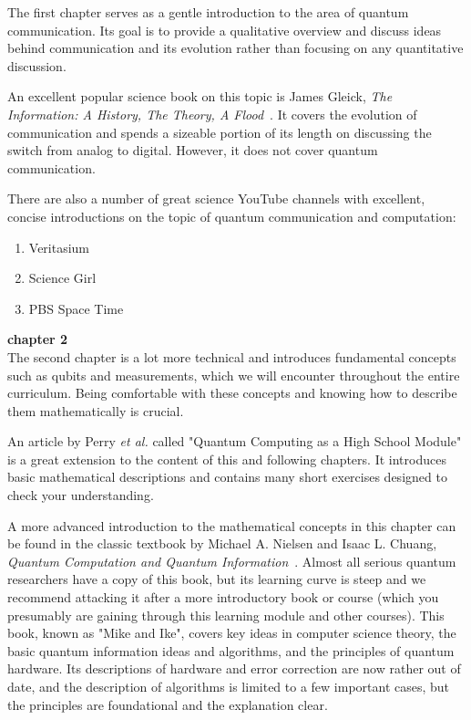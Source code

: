 The first chapter serves as a gentle introduction to the area of quantum communication. Its goal is to provide a qualitative overview and discuss ideas behind communication and its evolution rather than focusing on any quantitative discussion.

An excellent popular science book on this topic is James Gleick, \emph{The Information: A History, The Theory, A Flood}~\cite{gleick2012information}. It covers the evolution of communication and spends a sizeable portion of its length on discussing the switch from analog to digital. However, it does not cover quantum communication.

There are also a number of great science YouTube channels with excellent, concise introductions on the topic of quantum communication and computation:
\begin{enumerate}
    \item Veritasium
    \item Science Girl
    \item PBS Space Time
\end{enumerate}

{\bf chapter 2}\\

The second chapter is a lot more technical and introduces fundamental concepts such as qubits and measurements, which we will encounter throughout the entire curriculum. Being comfortable with these concepts and knowing how to describe them mathematically is crucial.

An article by Perry \emph{et al.} called "Quantum Computing as a High School Module" is a great extension to the content of this and following chapters. It introduces basic mathematical descriptions and contains many short exercises designed to check your understanding.

A more advanced introduction to the mathematical concepts in this chapter can be found in the classic textbook by Michael A. Nielsen and Isaac L. Chuang, \emph{Quantum Computation and Quantum Information}~\cite{nielsen-chuang:qci}. Almost all serious quantum researchers have a copy of this book, but its learning curve is steep and we recommend attacking it after a more introductory book or course (which you presumably are gaining through this learning module and other courses). This book, known as "Mike and Ike", covers key ideas in computer science theory, the basic quantum information ideas and algorithms, and the principles of quantum hardware. Its descriptions of hardware and error correction are now rather out of date, and the description of algorithms is limited to a few important cases, but the principles are foundational and the explanation clear.

